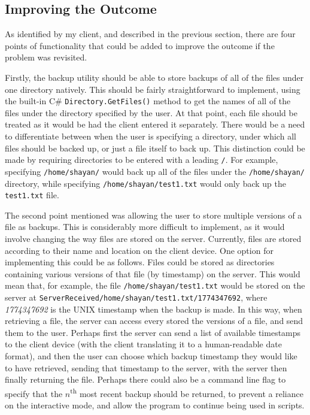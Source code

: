 \documentclass[../main.tex]{subfiles}
\begin{document}
\subsection{Improving the Outcome}

As identified by my client, and described in the previous section, there are four points of functionality that could be added to improve the outcome if the problem was revisited.

Firstly, the backup utility should be able to store backups of all of the files under one directory natively. This should be fairly straightforward to implement, using the built-in C\# \texttt{Directory.GetFiles()} method to get the names of all of the files under the directory specified by the user. At that point, each file should be treated as it would be had the client entered it separately. There would be a need to differentiate between when the user is specifying a directory, under which all files should be backed up, or just a file itself to back up. This distinction could be made by requiring directories to be entered with a leading \texttt{/}. For example, specifying \texttt{/home/shayan/} would back up all of the files under the \texttt{/home/shayan/} directory, while specifying \texttt{/home/shayan/test1.txt} would only back up the \texttt{test1.txt} file.

The second point mentioned was allowing the user to store multiple versions of a file as backups. This is considerably more difficult to implement, as it would involve changing the way files are stored on the server. Currently, files are stored according to their name and location on the client device. One option for implementing this could be as follows. Files could be stored as directories containing various versions of that file (by timestamp) on the server. This would mean that, for example, the file \texttt{/home/shayan/test1.txt} would be stored on the server at \texttt{ServerReceived/home/shayan/test1.txt/1774347692}, where \textit{1774347692} is the UNIX timestamp when the backup is made. In this way, when retrieving a file, the server can access every stored the versions of a file, and send them to the user. Perhaps first the server can send a list of available timestamps to the client device (with the client translating it to a human-readable date format), and then the user can choose which backup timestamp they would like to have retrieved, sending that timestamp to the server, with the server then finally returning the file. Perhaps there could also be a command line flag to specify that the $n$\textsuperscript{th} most recent backup should be returned, to prevent a reliance on the interactive mode, and allow the program to continue being used in scripts. 
\end{document}
